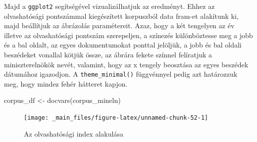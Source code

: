 \documentclass[
]{book}
\newenvironment{Shaded}{\begin{snugshade}}{\end{snugshade}}
\newcommand{\AttributeTok}[1]{\textcolor[rgb]{0.77,0.63,0.00}{#1}}
\newcommand{\DecValTok}[1]{\textcolor[rgb]{0.00,0.00,0.81}{#1}}
\newcommand{\FloatTok}[1]{\textcolor[rgb]{0.00,0.00,0.81}{#1}}
\newcommand{\FunctionTok}[1]{\textcolor[rgb]{0.00,0.00,0.00}{#1}}
\newcommand{\NormalTok}[1]{#1}
\newcommand{\OtherTok}[1]{\textcolor[rgb]{0.56,0.35,0.01}{#1}}
\newcommand{\SpecialCharTok}[1]{\textcolor[rgb]{0.00,0.00,0.00}{#1}}
\newcommand{\StringTok}[1]{\textcolor[rgb]{0.31,0.60,0.02}{#1}}
\begin{document}
Majd a \texttt{ggplot2} segítségével vizualizálhatjuk az eredményt.
Ehhez az olvashatósági pontszámmal kiegészített korpuszból data fram-et
alakítunk ki, majd beállítjuk az ábrázolás paramétereit. Azaz, hogy a
két tengelyen az év illetve az olvashatósági pontszám szerepeljen, a
színezés különböztesse meg a jobb és a bal oldalt, az egyes
dokumentumokat ponttal jelöljük, a jobb és bal oldali beszédeket
vonallal kötjük össze, az ábrára fekete színnel felíratjuk a
miniszterelnökök nevét, valamint, hogy az x tengely beosztása az egyes
beszédek dátumához igazodjon. A \texttt{theme\_minimal()} függvénnyel
pedig azt határozzuk meg, hogy mindez fehér hátteret kapjon.

\begin{Shaded}
\begin{Highlighting}[]
\NormalTok{corpus\_df }\OtherTok{\textless{}{-}} \FunctionTok{docvars}\NormalTok{(corpus\_mineln)}
\end{Highlighting}
\end{Shaded}

\begin{Shaded}
\end{Shaded}

\begin{figure}

{\centering \texttt{[image: \_main\_files/figure-latex/unnamed-chunk-52-1]} 

}

\caption{Az olvashatósági index alakulása}\label{fig:unnamed-chunk-52}
\end{figure}
\end{document}
